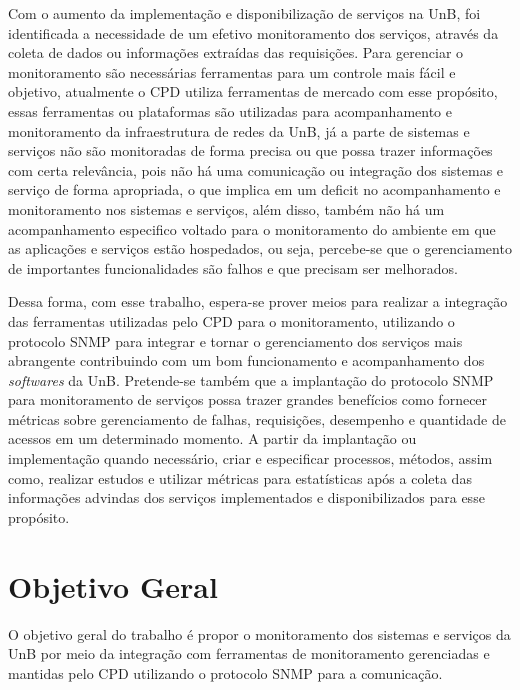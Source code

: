 Com o aumento da implementação e disponibilização de serviços na \acrshort{UnB}, foi identificada a necessidade de um efetivo monitoramento dos serviços, através da coleta de dados ou informações extraídas das requisições. Para gerenciar o monitoramento são necessárias ferramentas para um controle mais fácil e objetivo, atualmente o \acrshort{CPD} utiliza ferramentas de mercado com esse propósito, essas ferramentas ou  plataformas são utilizadas para acompanhamento e monitoramento da infraestrutura de redes da \acrshort{UnB}, já a parte de sistemas e serviços não são monitoradas de forma precisa ou que possa trazer informações com certa relevância, pois não há uma comunicação ou integração dos sistemas e serviço de forma apropriada, o que implica em um deficit no acompanhamento e monitoramento nos sistemas e serviços, além disso, também não há um acompanhamento especifico voltado para o monitoramento do ambiente em que as aplicações e serviços estão hospedados, ou seja, percebe-se que o gerenciamento de importantes funcionalidades são falhos e que precisam ser melhorados.

Dessa forma, com esse trabalho, espera-se prover meios para realizar a integração das ferramentas utilizadas pelo \acrshort{CPD} para o monitoramento, utilizando o protocolo \acrshort{SNMP} para integrar e tornar o gerenciamento dos serviços mais abrangente contribuindo com um bom funcionamento e acompanhamento dos \textit{softwares} da \acrshort{UnB}. Pretende-se também que a implantação do protocolo \acrshort{SNMP} para monitoramento de serviços possa trazer grandes benefícios como fornecer métricas sobre gerenciamento de falhas, requisições, desempenho e quantidade de acessos em um determinado momento. A partir da implantação ou implementação quando necessário, criar e especificar processos, métodos, assim como, realizar estudos e utilizar métricas para estatísticas após a coleta das informações advindas dos serviços implementados e disponibilizados para esse propósito. 


\section{Objetivo Geral}

O objetivo geral do trabalho é propor o monitoramento dos sistemas e serviços da \acrshort{UnB} por meio da integração com ferramentas de monitoramento gerenciadas e mantidas pelo \acrshort{CPD} utilizando o protocolo \acrshort{SNMP} para a comunicação. 

